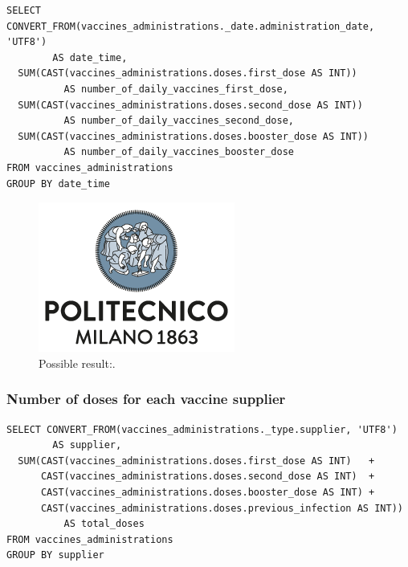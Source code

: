 \documentclass[12pt, a4paper]{article}
\begin{document}
\begin{tcolorbox}[fontupper=\scriptsize]
  \begin{verbatim}
SELECT CONVERT_FROM(vaccines_administrations._date.administration_date, 'UTF8') 
        AS date_time,
  SUM(CAST(vaccines_administrations.doses.first_dose AS INT)) 
          AS number_of_daily_vaccines_first_dose,
  SUM(CAST(vaccines_administrations.doses.second_dose AS INT)) 
          AS number_of_daily_vaccines_second_dose,
  SUM(CAST(vaccines_administrations.doses.booster_dose AS INT)) 
          AS number_of_daily_vaccines_booster_dose
FROM vaccines_administrations
GROUP BY date_time
  \end{verbatim}
\end{tcolorbox}

\noindent
\begin{figure}[ht]
  \centering
  \includegraphics[width=.6\linewidth]{polimi.png}
  \caption*{Possible result:.} %
\end{figure}

\subsubsection{Number of doses for each vaccine supplier}

\begin{tcolorbox}[fontupper=\scriptsize]
  \begin{verbatim}
SELECT CONVERT_FROM(vaccines_administrations._type.supplier, 'UTF8') 
        AS supplier,
  SUM(CAST(vaccines_administrations.doses.first_dose AS INT)   + 
      CAST(vaccines_administrations.doses.second_dose AS INT)  + 
      CAST(vaccines_administrations.doses.booster_dose AS INT) +
      CAST(vaccines_administrations.doses.previous_infection AS INT)) 
          AS total_doses
FROM vaccines_administrations
GROUP BY supplier
  \end{verbatim}
\end{tcolorbox}
\end{document}
